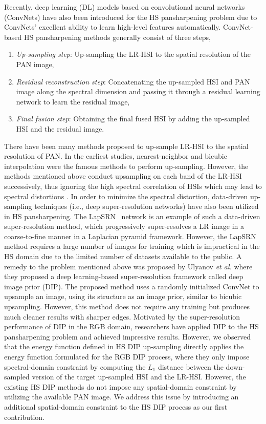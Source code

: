 \documentclass[journal]{IEEEtran}
\begin{document}
\par Recently, deep learning (DL) models based on convolutional neural networks (ConvNets) have also been introduced for the HS pansharpening problem due to ConvNets' excellent ability to learn high-level features automatically.  ConvNet-based HS pansharpening methods generally consist of three steps, 
\begin{enumerate}
    \item \textit{Up-sampling step}: Up-sampling the LR-HSI to the spatial resolution of the PAN image, 
    \item \textit{Residual reconstruction step}: Concatenating the up-sampled HSI and PAN image along the spectral dimension and passing it through a residual learning network to learn the residual image,
    \item \textit{Final fusion step}: Obtaining the final fused HSI by adding the up-sampled HSI and the residual image.
\end{enumerate}

\par There have been many  methods proposed to up-sample LR-HSI to the spatial resolution of PAN. In the earliest studies, nearest-neighbor and bicubic interpolation were the famous methods to perform up-sampling. However, the methods mentioned above conduct upsampling on each band of the LR-HSI successively, thus ignoring the high spectral correlation of HSIs which may lead to spectral distortions \cite{DHP-DARN, DeepImagePrior}. In order to minimize the spectral distortion, data-driven up-sampling techniques (i.e., deep super-resolution networks) have also been utilized in HS pansharpening. The LapSRN~\cite{LapSRN} network is an example of such a data-driven super-resolution method, which progressively super-resolves a LR image in a coarse-to-fine manner in a Laplacian pyramid framework. However, the LapSRN method requires a large number of images for training which is impractical in the HS domain due to the limited number of datasets available to the public.  A remedy to the problem mentioned above was proposed by Ulyanov \textit{et al.} \cite{DeepImagePrior} where they proposed a deep learning-based super-resolution framework called deep image prior (DIP). The proposed method uses a randomly initialized ConvNet to upsample an image, using its structure as an image prior, similar to bicubic upsampling. However, this method does not require any training but produces much cleaner results with sharper edges. Motivated by the super-resolution performance of DIP in the RGB domain, researchers have applied DIP to the HS pansharpening problem \cite{DeepHyperspectralPrior, DHP-DARN} and achieved impressive results. However, we observed that the energy function defined in HS DIP up-sampling directly applies the energy function formulated for the RGB DIP process, where they only impose spectral-domain constraint by computing the $L_1$ distance between the down-sampled version of the target up-sampled HSI and the LR-HSI. However, the existing HS DIP methods do not impose any spatial-domain constraint by utilizing the available PAN image. We address this issue by introducing an additional spatial-domain constraint to the HS DIP process as our first contribution.
\end{document}
